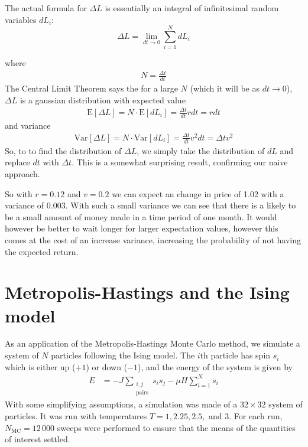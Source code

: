 \documentclass[twocolumn]{myarticle}
\begin{document}
The actual formula for $\Delta L$ is essentially an integral of infinitesimal random variables $dL_{i}$:
\begin{equation}
    \Delta L = \lim_{dt \to 0} \sum^{N}_{i=1} dL_i
\end{equation}
 
where
\begin{align}
    N=\frac{\Delta t}{dt} 
\end{align}
The Central Limit Theorem says the for a large $N$ (which it will be as $ dt \to 0 $), $\Delta L$ is a gaussian distribution with expected value
\begin{align}
    \text{E}[\Delta L]=N \cdot \text{E}[dL_{i}]=\frac{\Delta t}{dt}rdt = r dt 
\end{align}
and variance
\begin{align}
    \text{Var}[\Delta L]=N \cdot \text{Var}[dL_{i}] = \frac{\Delta t}{dt}v^{2}dt = \Delta tv^{2} 
\end{align}
So, to to find the distribution of $ \Delta L $, we simply take the distribution of $ dL $ and replace $ dt $ with $ \Delta t $.
This is a somewhat surprising result, confirming our naive approach.

So with $r=0.12$ and $v=0.2$ we can expect an change in price of 1.02 with a variance of 0.003. 
With such a small variance we can see that there is a likely to be a small amount of money made in a time period of one month. 
It would however be better to wait longer for larger expectation values, however this comes at the cost of an increase variance, increasing the probability of not having the expected return.

\section{Metropolis-Hastings and the Ising model}
\label{sec:metropolis_hastings_and_the_ising_model}

As an application of the Metropolis-Hastings Monte Carlo method, we simulate a system of $ N $ particles following the Ising model.
The $ i $th particle has spin $ s_i $ which is either up ($ +1 $) or down ($ -1 $), and the energy of the system is given by
\begin{align}
    E &= -J \sum_{\substack{i,j \\ \text{pairs}}} s_i s_j - \mu H \sum_{i=1}^{N} s_i
\end{align}
With some simplifying assumptions, a simulation was made of a $ 32 \times 32 $ system of particles.
It was run with temperatures $ T = 1, 2.25, 2.5, $ and $ 3 $.
For each run, $ N_\text{MC} = 12\,000 $ sweeps were performed to ensure that the means of the quantities of interest settled.
\end{document}

